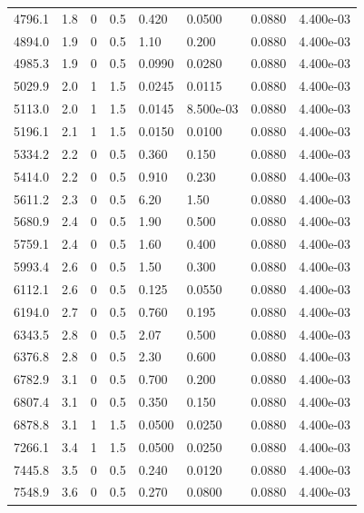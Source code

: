 \documentclass[preview]{standalone}
\begin{document}
{{{\begin{tabular}{L{1.2cm}C{1.2cm} C{0.3cm}C{0.5cm} C{1.4cm}C{1.4cm} C{1.4cm}C{1.4cm}}
  4796.1  &   1.8  & 0     & 0.5 &  0.420  & 0.0500  & 0.0880 &  4.400e-03   \\ 
  4894.0  &   1.9  & 0     & 0.5 &  1.10  & 0.200  & 0.0880 &  4.400e-03   \\ 
  4985.3  &   1.9  & 0     & 0.5 &  0.0990  & 0.0280  & 0.0880 &  4.400e-03   \\ 
  5029.9  &   2.0  & 1     & 1.5 &  0.0245  & 0.0115  & 0.0880 &  4.400e-03   \\ 
  5113.0  &   2.0  & 1     & 1.5 &  0.0145  & 8.500e-03  & 0.0880 &  4.400e-03   \\ 
  5196.1  &   2.1  & 1     & 1.5 &  0.0150  & 0.0100  & 0.0880 &  4.400e-03   \\ 
  5334.2  &   2.2  & 0     & 0.5 &  0.360  & 0.150  & 0.0880 &  4.400e-03   \\ 
  5414.0  &   2.2  & 0     & 0.5 &  0.910  & 0.230  & 0.0880 &  4.400e-03   \\ 
  5611.2  &   2.3  & 0     & 0.5 &  6.20  & 1.50  & 0.0880 &  4.400e-03   \\ 
  5680.9  &   2.4  & 0     & 0.5 &  1.90  & 0.500  & 0.0880 &  4.400e-03   \\ 
  5759.1  &   2.4  & 0     & 0.5 &  1.60  & 0.400  & 0.0880 &  4.400e-03   \\ 
  5993.4  &   2.6  & 0     & 0.5 &  1.50  & 0.300  & 0.0880 &  4.400e-03   \\ 
  6112.1  &   2.6  & 0     & 0.5 &  0.125  & 0.0550  & 0.0880 &  4.400e-03   \\ 
  6194.0  &   2.7  & 0     & 0.5 &  0.760  & 0.195  & 0.0880 &  4.400e-03   \\ 
  6343.5  &   2.8  & 0     & 0.5 &  2.07  & 0.500  & 0.0880 &  4.400e-03   \\ 
  6376.8  &   2.8  & 0     & 0.5 &  2.30  & 0.600  & 0.0880 &  4.400e-03   \\ 
  6782.9  &   3.1  & 0     & 0.5 &  0.700  & 0.200  & 0.0880 &  4.400e-03   \\ 
  6807.4  &   3.1  & 0     & 0.5 &  0.350  & 0.150  & 0.0880 &  4.400e-03   \\ 
  6878.8  &   3.1  & 1     & 1.5 &  0.0500  & 0.0250  & 0.0880 &  4.400e-03   \\ 
  7266.1  &   3.4  & 1     & 1.5 &  0.0500  & 0.0250  & 0.0880 &  4.400e-03   \\ 
  7445.8  &   3.5  & 0     & 0.5 &  0.240  & 0.0120  & 0.0880 &  4.400e-03   \\ 
  7548.9  &   3.6  & 0     & 0.5 &  0.270  & 0.0800  & 0.0880 &  4.400e-03   \\ 

\end{tabular}}}}
\end{document}
